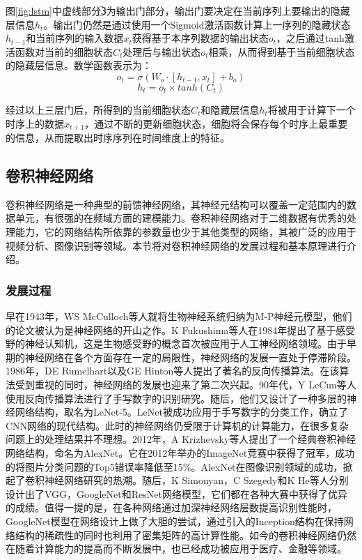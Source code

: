 图\ref{fig:lstm}中虚线部分\textcircled{3}为输出门部分，输出门要决定在当前序列上要输出的隐藏层信息$h_t$。输出门仍然是通过使用一个Sigmoid激活函数计算上一序列的隐藏状态$h_{t-1}$和当前序列的输入数据$x_t$获得基于本序列数据的输出状态$o_t$，之后通过tanh激活函数对当前的细胞状态$C_t$处理后与输出状态$o_t$相乘，从而得到基于当前细胞状态的隐藏层信息。数学函数表示为：
\begin{equation}
 o_t= \sigma(W_o \cdot [h_{t-1},x_t]+b_o)
\end{equation}
\begin{equation}
 h_t= o_t \times tanh(C_t)
\end{equation}

经过以上三层门后，所得到的当前细胞状态$C_t$和隐藏层信息$h_t$将被用于计算下一个时序上的数据$x_{t+1}$，通过不断的更新细胞状态，细胞将会保存每个时序上最重要的信息，从而提取出时序序列在时间维度上的特征。

\subsection{卷积神经网络}
\label{sec:cnn}
卷积神经网络是一种典型的前馈神经网络，其神经元结构可以覆盖一定范围内的数据单元，有很强的在频域方面的建模能力。卷积神经网络对于二维数据有优秀的处理能力，它的网络结构所依靠的参数量也少于其他类型的网络，其被广泛的应用于视频分析、图像识别等领域。本节将对卷积神经网络的发展过程和基本原理进行介绍。
\subsubsection{发展过程}
早在1943年，WS McCulloch等人就将生物神经系统归纳为M-P神经元模型，他们的论文被认为是神经网络的开山之作\supercite{mcculloch1943logical}。K Fukushima等人在1984年提出了基于感受野的神经认知机，这是生物感受野的概念首次被应用于人工神经网络领域\supercite{fukushima1982neocognitron}。由于早期的神经网络在各个方面存在一定的局限性，神经网络的发展一直处于停滞阶段。1986年，DE Rumelhart以及GE Hinton等人提出了著名的反向传播算法\supercite{7}。在该算法受到重视的同时，神经网络的发展也迎来了第二次兴起。90年代，Y LeCun等人使用反向传播算法进行了手写数字的识别研究\supercite{lecun1990handwritten}。随后，他们又设计了一种多层的神经网络结构，取名为LeNet-5\supercite{6}。LeNet被成功应用于手写数字的分类工作，确立了CNN网络的现代结构。此时的神经网络仍受限于计算机的计算能力，在很多复杂问题上的处理结果并不理想。2012年，A Krizhevsky等人提出了一个经典卷积神经网络结构，命名为AlexNet\supercite{8}。它在2012年举办的ImageNet竞赛中获得了冠军，成功的将图片分类问题的Top5错误率降低至15\%。AlexNet在图像识别领域的成功，掀起了卷积神经网络研究的热潮。随后，K Simonyan，C Szegedy和K He等人分别设计出了VGG\supercite{9}，GoogleNet\supercite{10}和ResNet\supercite{11}网络模型，它们都在各种大赛中获得了优异的成绩。值得一提的是，在各种网络通过加深神经网络层数提高识别性能时，GoogleNet模型在网络设计上做了大胆的尝试，通过引入的Inception结构在保持网络结构的稀疏性的同时也利用了密集矩阵的高计算性能。如今的卷积神经网络仍然在随着计算能力的提高而不断发展中，也已经成功被应用于医疗、金融等领域。

